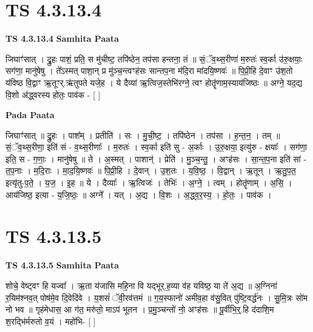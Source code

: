 \documentclass[17pt]{extarticle}
\begin{document}

\section{ TS 4.3.13.4 }

\textbf{TS 4.3.13.4 } \newline
\textbf{Samhita Paata} \newline

जिघाꣳ॑सात् । द्रु॒हः पाशं॒ प्रति॒ स मु॑चीष्ट॒ तपि॑ष्ठेन॒ तप॑सा हन्तना॒ तं ॥ सं॒ॅव॒थ्स॒रीणा॑ म॒रुतः॑ स्व॒र्का उ॑रु॒क्षयाः॒ सग॑णा॒ मानु॑षेषु । ते᳚ऽस्मत् पाशा॒न् प्र मु॑ञ्च॒न्त्वꣳह॑सः सान्तप॒ना म॑दि॒रा मा॑दयि॒ष्णवः॑ ॥ पि॒प्री॒हि दे॒वाꣳ उ॑श॒तो य॑विष्ठ वि॒द्वाꣳ ऋ॒तूꣳर्.ऋ॑तुपते यजे॒ह । ये दैव्या॑ ऋ॒त्विज॒स्तेभि॑रग्ने॒ त्वꣳ होतॄ॑णाम॒स्याय॑जिष्ठः ॥ अग्ने॒ यद॒द्य वि॒शो अ॑द्ध्वरस्य होतः॒ पाव॑क - [  ] \newline

\textbf{Pada Paata} \newline

जिघाꣳ॑सात् ॥ द्रु॒हः । पाश᳚म् । प्रतीति॑ । सः । मु॒ची॒ष्ट॒ । तपि॑ष्ठेन । तप॑सा । ह॒न्त॒न॒ । तम् ॥ सं॒ॅव॒थ्स॒रीणा॒ इति॑ सं - व॒थ्स॒रीणाः᳚ । म॒रुतः॑ । स्व॒र्का इति॑ सु - अ॒र्काः । उ॒रु॒क्षया॒ इत्यु॑रु - क्षयाः᳚ । सग॑णा॒ इति॒ स - ग॒णाः॒ । मानु॑षेषु ॥ ते । अ॒स्मत् । पाशान्॑ । प्रेति॑ । मु॒ञ्च॒न्तु॒ । अꣳह॑सः । सा॒न्त॒प॒ना इति॑ सां - त॒प॒नाः । म॒दि॒राः । मा॒द॒यि॒ष्णवः॑ ॥ पि॒प्री॒हि । दे॒वान् । उ॒श॒तः । य॒वि॒ष्ठ॒ । वि॒द्वान् । ऋ॒तून् । ऋ॒तु॒प॒त॒ इत्यृ॑तु-प॒ते॒ । य॒ज॒ । इ॒ह ॥ ये । दैव्याः᳚ । ऋ॒त्विजः॑ । तेभिः॑ । अ॒ग्ने॒ । त्वम् । होतॄ॑णाम् । अ॒सि॒ । आय॑जिष्ठ॒ इत्या - य॒जि॒ष्ठः॒ ॥ अग्ने᳚ । यत् । अ॒द्य । वि॒शः । अ॒द्ध्व॒र॒स्य॒ । हो॒तः॒ । पाव॑क ।  \newline





\section{ TS 4.3.13.5 }

\textbf{TS 4.3.13.5 } \newline
\textbf{Samhita Paata} \newline

शोचे॒ वेष्ट्वꣳ हि यज्वा᳚ । ऋ॒ता य॑जासि महि॒ना वि यद्भूर्.ह॒व्या व॑ह यविष्ठ॒ या ते॑ अ॒द्य ॥ अ॒ग्निना॑ र॒यिम॑श्नव॒त् पोष॑मे॒व दि॒वेदि॑वे । य॒शसं॑ ॅवी॒रव॑त्तमं ॥ ग॒य॒स्फानो॑ अमीव॒हा व॑सु॒वित् पु॑ष्टि॒वर्द्ध॑नः । सु॒मि॒त्रः सो॑म नो भव ॥ गृह॑मेधास॒ आ ग॑त॒ मरु॑तो॒ माऽप॑ भूतन । प्र॒मु॒ञ्चन्तो॑ नो॒ अꣳह॑सः ॥ पू॒र्वीभि॒र्॒.हि द॑दाशि॒म श॒रद्भि॑र्मरुतो व॒यं । महो॑भि- [  ] \newline
\end{document}

